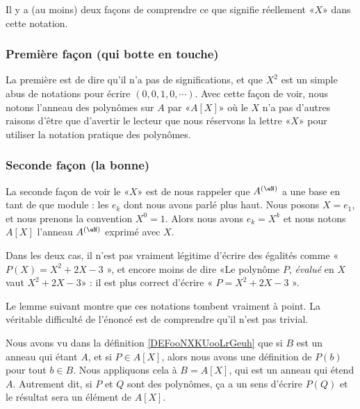 Il y a (au moins) deux façons de comprendre ce que signifie réellement «\( X\)» dans cette notation.

\subsubsection{Première façon (qui botte en touche)}

La première est de dire qu'il n'a pas de significations, et que \( X^2\) est un simple abus de notations pour écrire \( (0,0,1,0,\cdots)\). Avec cette façon de voir, nous notons l'anneau des polynômes sur \( A\) par «\( A[X]\)» où le \( X\) n'a pas d'autres raisons d'être que d'avertir le lecteur que nous réservons la lettre «\( X\)» pour utiliser la notation pratique des polynômes.

\subsubsection{Seconde façon (la bonne)}
\label{SUBSUBSECooPNBYooWXEHrg}

La seconde façon de voir le «\( X\)» est de nous rappeler que \( A^{(\eN)}\) a une base en tant de que module : les \( e_k\) dont nous avons parlé plus haut. Nous posons \( X=e_1\), et nous prenons la convention \( X^0=1\). Alors nous avons \( e_k=X^k\) et nous notons \( A[X]\) l'anneau \(A^{(\eN)}\) exprimé avec \( X\).

Dans les deux cas, il n'est pas vraiment légitime d'écrire des égalités comme « \( P(X)=X^2+2X-3\) », et encore moins de dire «Le polynôme \( P\), \emph{évalué} en \( X\) vaut \( X^2+2X-3\)»  : il est plus correct d'écrire « \( P=X^2+2X-3\) ».

Le lemme suivant montre que ces notations tombent vraiment à point. La véritable difficulté de l'énoncé est de comprendre qu'il n'est pas trivial.

Nous avons vu dans la définition \ref{DEFooNXKUooLrGeuh} que si \( B\) est un anneau qui étant \( A\), et si \(P\in A[X] \), alors nous avons une définition de \( P(b)\) pour tout \( b\in B\). Nous appliquons cela à \( B=A[X]\), qui est un anneau qui étend \( A\). Autrement dit, si \( P\) et \( Q\) sont des polynômes, ça a un sens d'écrire \( P(Q)\) et le résultat sera un élément de \( A[X]\). 

